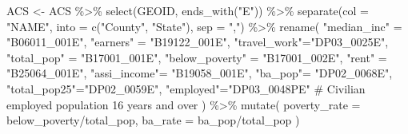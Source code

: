 \documentclass[
  letterpaper,
  DIV=11,
  numbers=noendperiod]{scrartcl}
\newenvironment{Shaded}{\begin{snugshade}}{\end{snugshade}}
\newcommand{\AttributeTok}[1]{\textcolor[rgb]{0.40,0.45,0.13}{#1}}
\newcommand{\CommentTok}[1]{\textcolor[rgb]{0.37,0.37,0.37}{#1}}
\newcommand{\FunctionTok}[1]{\textcolor[rgb]{0.28,0.35,0.67}{#1}}
\newcommand{\NormalTok}[1]{\textcolor[rgb]{0.00,0.23,0.31}{#1}}
\newcommand{\OtherTok}[1]{\textcolor[rgb]{0.00,0.23,0.31}{#1}}
\newcommand{\SpecialCharTok}[1]{\textcolor[rgb]{0.37,0.37,0.37}{#1}}
\newcommand{\StringTok}[1]{\textcolor[rgb]{0.13,0.47,0.30}{#1}}
\begin{document}
\begin{Shaded}
\begin{Highlighting}[]
\NormalTok{ACS }\OtherTok{\textless{}{-}}\NormalTok{ ACS }\SpecialCharTok{\%\textgreater{}\%}  
  \FunctionTok{select}\NormalTok{(GEOID, }\FunctionTok{ends\_with}\NormalTok{(}\StringTok{"E"}\NormalTok{)) }\SpecialCharTok{\%\textgreater{}\%}
  \FunctionTok{separate}\NormalTok{(}\AttributeTok{col =} \StringTok{"NAME"}\NormalTok{, }\AttributeTok{into =} \FunctionTok{c}\NormalTok{(}\StringTok{"County"}\NormalTok{, }\StringTok{"State"}\NormalTok{), }\AttributeTok{sep =} \StringTok{","}\NormalTok{) }\SpecialCharTok{\%\textgreater{}\%}
  \FunctionTok{rename}\NormalTok{(}
    \StringTok{"median\_inc"} \OtherTok{=} \StringTok{"B06011\_001E"}\NormalTok{,}
    \StringTok{"earners"} \OtherTok{=} \StringTok{"B19122\_001E"}\NormalTok{,}
    \StringTok{"travel\_work"}\OtherTok{=}\StringTok{"DP03\_0025E"}\NormalTok{,}
    \StringTok{"total\_pop"} \OtherTok{=} \StringTok{"B17001\_001E"}\NormalTok{,}
    \StringTok{"below\_poverty"} \OtherTok{=} \StringTok{"B17001\_002E"}\NormalTok{,}
    \StringTok{"rent"} \OtherTok{=} \StringTok{"B25064\_001E"}\NormalTok{,}
    \StringTok{"assi\_income"}\OtherTok{=} \StringTok{"B19058\_001E"}\NormalTok{,}
    \StringTok{"ba\_pop"}\OtherTok{=} \StringTok{"DP02\_0068E"}\NormalTok{,}
    \StringTok{"total\_pop25"}\OtherTok{=}\StringTok{"DP02\_0059E"}\NormalTok{,}
    \StringTok{"employed"}\OtherTok{=}\StringTok{"DP03\_0048PE"} \CommentTok{\# Civilian employed population 16 years and over}
\NormalTok{) }\SpecialCharTok{\%\textgreater{}\%}
  \FunctionTok{mutate}\NormalTok{(}
    \AttributeTok{poverty\_rate =}\NormalTok{ below\_poverty}\SpecialCharTok{/}\NormalTok{total\_pop,}
    \AttributeTok{ba\_rate =}\NormalTok{ ba\_pop}\SpecialCharTok{/}\NormalTok{total\_pop}
\NormalTok{  )}
\end{Highlighting}
\end{Shaded}
\end{document}
